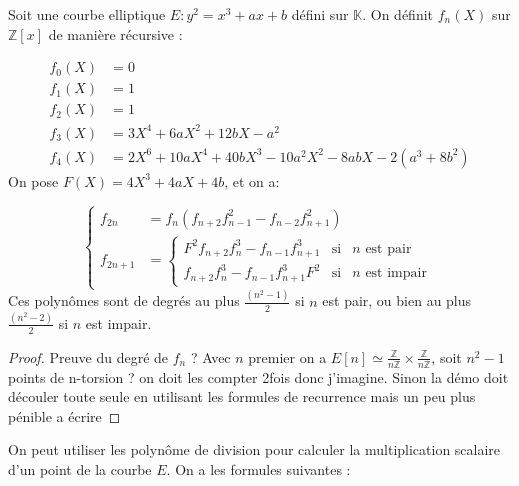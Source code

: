 \documentclass{article}
\begin{document}
\begin{defi}
Soit une courbe elliptique $E : y^2 = x^3 + ax+b$ défini sur $\mathbb{K}$. On définit $f_n(X)$ sur $\mathbb{Z}[x]$ de manière récursive : 


\begin{align*}
f_0(X) &= 0 \\
f_1(X) &= 1 \\
f_2(X) &= 1 \\
f_3(X) &= 3X^4 + 6aX^2 +12bX - a^2 \\
f_4(X) &= 2X^6 + 10aX^4 +40bX^3 - 10a^2X^2 - 8abX - 2(a^3 + 8b^2)
\end{align*}
On pose $F(X)= 4X^3 + 4aX + 4b$, et on a:

\begin{equation}
\left\lbrace
\begin{array}{ll}
f_{2n}& =  f_n(f_{n+2}f_{n-1}^2 - f_{n-2}f_{n+1}^2)   \\
f_{2n+1}& = \left\lbrace 
\begin{array}{ccc}
F^2f_{n+2}f_n^3 - f_{n-1}f_{n+1}^3 & \mbox{si} & n \text{ est pair}\\
f_{n+2}f_n^3 - f_{n-1}f_{n+1}^3F^2 & \mbox{si} & n \text{ est impair} \end{array}\right.

\end{array} \right.
\end{equation} 
Ces polynômes sont de degrés au plus $\frac{(n^2 -1)}{2}$ si $n$ est pair, ou bien  au plus $\frac{(n^2 -2)}{2}$ si $n$ est impair.
\end{defi}

\begin{proof}
Preuve du degré de $f_n$ ? 
Avec $n$ premier on a $E[n] \simeq \frac{\mathbb{Z}}{n\mathbb{Z}} \times \frac{\mathbb{Z}}{n\mathbb{Z}}$, soit $n^2 - 1$ points de n-torsion ? on doit les compter 2fois donc j'imagine. Sinon la démo doit découler toute seule en utilisant les formules de recurrence mais un peu plus pénible a écrire
\end{proof}

On peut utiliser les polynôme de division pour calculer la multiplication scalaire d'un point de la courbe $E$.
On a les formules suivantes : 
\end{document}
